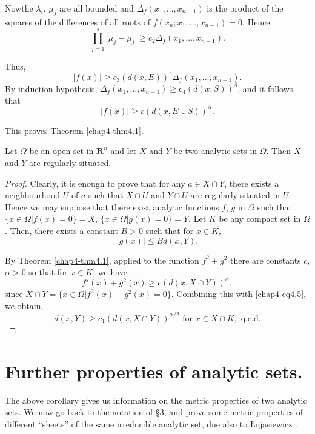 \noindent
Now\pageoriginale the $\lambda_i$, $\mu_j$ are all bounded and $\Delta_f (x_1, \ldots, x_{n-1})$ is the product of the squares of the differences of all roots of $f(x_n; x_1, \ldots, x_{n-1}) =0$.
Hence
$$
\prod\limits^s_{j=1} |\mu_j - \bar{\mu_j}| \geq c_2 \Delta_f (x_1, \ldots, x_{n-1}).
$$

Thus,
$$
|f(x)| \geq c_3 (d (x, E))^r \Delta_f (x_1, \ldots, x_{n-1}).
$$
By induction hypothesis, $\Delta_f (x_1, \ldots, x_{n-1}) \geq c_4 (d (x; S))^\beta$, and it follows that
$$
|f(x)| \geq c (d (x, E \cup S))^\alpha. 
$$

This proves Theorem \ref{chap4-thm4.1}.

\setcounter{theorem}{3}
\begin{corollary}\label{chap4-coro4.4}
Let $\Omega$ be an open set in $\mathbf{R}^n$ and let $X$ and $Y$ be two analytic sets in $\Omega$. Then $X$ and $Y$ are regularly situated. 
\end{corollary}

\begin{proof}
  Clearly, it is enough to prove that for any $a \in X \cap Y$, there exists a neighbourhood $U$ of $a$ such that $X \cap U$ and $Y \cap U$ are regularly situated in $U$. Hence we may suppose that there exist analytic functions $f$, $g$ in $\Omega$ such that $\{x \in \Omega | f (x) = 0 \} = X$, $\{x \in \Omega | g (x) =0 \} = Y$. Let $K$  be any compact set in $\Omega$. Then, there exists a constant $B >0 $ such that for $x \in K$,
 \setcounter{equation}{4}
  \begin{equation}
    |g(x)| \leq B d (x, Y). \label{chap4-eq4.5}
  \end{equation}

  By Theorem \ref{chap4-thm4.1}, applied to the function $f^2 + g^2$ there are constants $c$, $\alpha > 0$ so that for $x \in K$, we have
  $$
f^s (x) + g^2 (x) \geq c (d (x, X \cap Y))^\alpha,
$$
since $X \cap Y = \{x \in \Omega| f^2 (x) + g^2 (x) = 0\}$. Combining this with \eqref{chap4-eq4.5}, we obtain,
$$
d (x, Y) \geq c_1 (d (x, X \cap Y))^{\alpha/2} \text{ for  } x \in X \cap K , \text{ q.e.d.}
$$
\end{proof}

\section[Further properties of analytic sets]{Further properties of analytic sets.}\label{chap4-sec5}%

The above corollary gives us information on the metric properties of two analytic sets. We now go back to the notation of \S 3, and prove some metric properties of different ``sheets'' of the same irreducible analytic set, due also to {\L}ojasiewicz \cite{S. Lojasiewicz : 1}.

